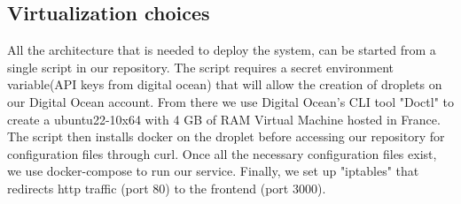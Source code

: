 \subsection{Virtualization choices}
All the architecture that is needed to deploy the system, can be started from a single script in our repository.
The script requires a secret environment variable(API keys from digital ocean) that will allow the creation of droplets on our Digital Ocean account. From there we use Digital Ocean's CLI tool "Doctl" to create a ubuntu22-10x64 with 4 GB of RAM Virtual Machine hosted in France. The script then installs docker on the droplet before accessing our repository for configuration files through curl. Once all the necessary configuration files exist, we use docker-compose to run our service. Finally, we set up "iptables" that redirects http traffic (port 80) to the frontend (port 3000). 